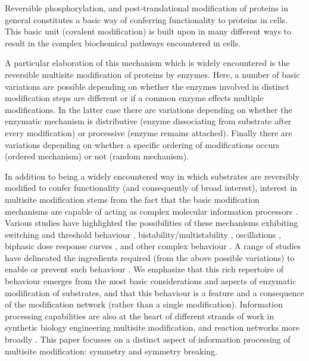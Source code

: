 \documentclass[9pt,lineno]{elife}
\begin{document}
Reversible phosphorylation, and post-translational modification  of proteins in general constitutes a basic way of conferring functionality to proteins in cells. This basic unit (covalent modification) is built upon in many different ways to result in the complex biochemical pathways encountered in cells.
    
A particular elaboration of this mechanism which is widely encountered is the reversible multisite modification of proteins by enzymes. Here, a number of basic variations are possible depending on whether the enzymes involved in distinct modification steps are different or if a common enzyme effects multiple modifications. In the latter case there are variations depending on whether the enzymatic mechanism is distributive (enzyme dissociating from substrate after every modification) or processive  (enzyme remains attached). Finally there are variations depending on whether a specific ordering of modifications occurs (ordered mechanism) or not (random mechanism).
    
In addition to being a widely encountered way in which substrates are reversibly modified  to confer functionality (and consequently of broad interest), interest in multisite modification stems from the fact that the basic modification mechanisms are capable of acting as complex molecular information processors \cite{Conradi2018}.
Various studies have highlighted the possibilities of these mechanisms exhibiting switching and threshold behaviour \cite{Markevich2004}, bistability/multistability \cite{Thomson2009,Conradi2014}, oscillations \cite{Rubinstein2016,Suwanmajo2015,Suwanmajo2020}, biphasic dose response curves \cite{Suwanmajo2013}, and other complex behaviour \cite{Suwanmajo2018}. A range of studies have delineated the ingredients required (from the above possible variations) to enable or prevent such behaviour \cite{Conradi2017a, Eithun2017,Tung2018}. We emphasize that this rich repertoire of behaviour emerges from the most basic considerations and aspects of enzymatic modification of substrates, and that this behaviour is a feature and a consequence of the modification network (rather than a single modification). Information processing capabilities are also at the heart of different strands of work in synthetic biology engineering multisite modification, and reaction networks more broadly \cite{Valk2014,Lyons2013,OShaughnessy2011,Maguire2019}.
This paper focusses on a distinct aspect of information processing of multisite modification: symmetry and symmetry breaking. 
\end{document}
